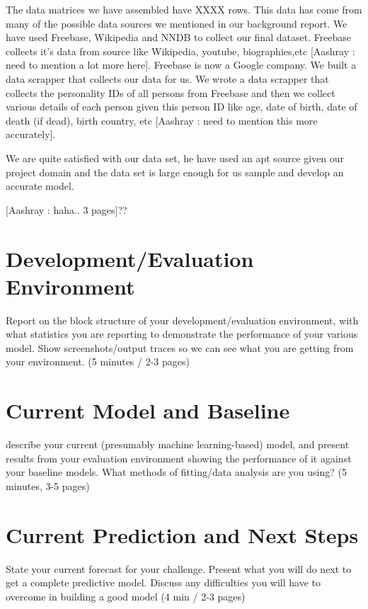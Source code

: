 \documentclass[runningheads]{llncs}
\begin{document}
The data matrices we have assembled have XXXX rows. This data has come from many of the possible data sources we mentioned in 
our background report. We have used Freebase, Wikipedia and NNDB to collect our final dataset. Freebase collects it's data from source 
like Wikipedia, youtube, biographies,etc [Aashray : need to mention a lot more here]. Freebase is now a Google company. We built a data scrapper 
that collects our data for us. We wrote a data scrapper that collects the personality IDs of all persons from Freebase and then we collect 
various details of each person given this person ID like age, date of birth, date of death (if dead), birth country, etc [Aashray : need to mention this more accurately]. 

We are quite satisfied with our data set, he have used an apt source given our project domain and the data set is large enough for us sample and develop an accurate model.

[Aashray : haha.. 3 pages]??

\section{Development/Evaluation Environment}

Report on the block structure of your development/evaluation environment, with what statistics you are reporting to demonstrate the performance of your various model.  Show screenshots/output traces so we can see what you are getting from your environment. (5 minutes / 2-3 pages)


\section{Current Model and Baseline}

describe your current (presumably machine learning-based) model, and present results from your evaluation environment showing the performance of it against your baseline models. What methods of fitting/data analysis are you using? (5 minutes, 3-5 pages)


\section{Current Prediction and Next Steps}

State your current forecast for your challenge. Present what you will do next to get a complete predictive model.  Discuss any difficulties you will have to overcome in building a good model   (4 min / 2-3 pages)
\end{document}
